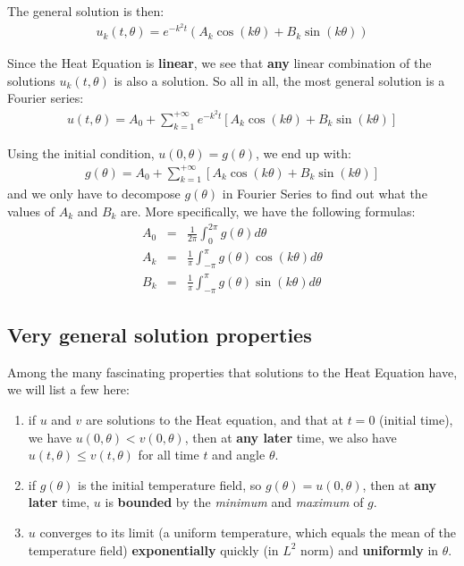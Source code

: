 \documentclass[10pt]{article}
\begin{document}
The general solution is then:
\begin{eqnarray}
u_{k}(t,\theta) = e^{-k^2 t}\left(A_{k}\cos(k\theta) + B_{k}\sin(k\theta)\right)
\end{eqnarray}

Since the Heat Equation is \textbf{linear}, we see that \textbf{any} linear combination of the solutions $u_{k}(t,\theta)$ is also a solution. So all in all, the most general solution is a Fourier series:
\begin{eqnarray}
u(t,\theta) = A_{0} + \sum_{k=1}^{+\infty} e^{-k^2 t}\left[A_{k}\cos(k\theta) + B_{k}\sin(k\theta)\right]
\end{eqnarray}

Using the initial condition, $u(0,\theta)=g(\theta)$, we end up with:
\begin{eqnarray}
g(\theta) = A_{0} + \sum_{k=1}^{+\infty}\left[A_{k}\cos(k\theta) + B_{k}\sin(k\theta)\right]
\end{eqnarray}
and we only have to decompose $g(\theta)$ in Fourier Series to find out what the values of $A_{k}$ and $B_{k}$ are. More specifically, we have the following formulas:
\begin{eqnarray}
A_{0} &=& \frac{1}{2\pi}\int_{0}^{2\pi}g(\theta)d\theta \nonumber \\
A_{k} &=& \frac{1}{\pi}\int_{-\pi}^{\pi}g(\theta)\cos(k\theta)d\theta \\
B_{k} &=& \frac{1}{\pi}\int_{-\pi}^{\pi}g(\theta)\sin(k\theta)d\theta \nonumber
\end{eqnarray}

\subsection{Very general solution properties}

Among the many fascinating properties that solutions to the Heat Equation have, we will list a few here:
\begin{enumerate}
\item if $u$ and $v$ are solutions to the Heat equation, and that at $t=0$ (initial time), we have $u(0,\theta) < v(0,\theta)$, then at \textbf{any later} time, we also have $u(t,\theta)\leq v(t,\theta)$ for all time $t$ and angle $\theta$.
\item if $g(\theta)$ is the initial temperature field, so $g(\theta)=u(0,\theta)$, then at \textbf{any later} time, $u$ is \textbf{bounded} by the \textit{minimum} and \textit{maximum} of $g$.
\item $u$ converges to its limit (a uniform temperature, which equals the mean of the temperature field) \textbf{exponentially} quickly (in $L^2$ norm) and \textbf{uniformly} in $\theta$.
\end{enumerate}
\end{document}
